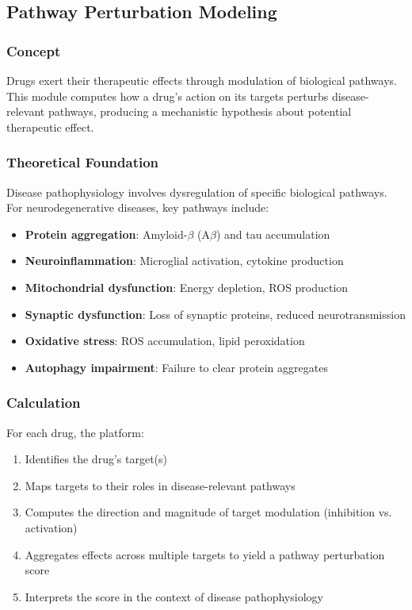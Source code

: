 \documentclass[12pt,a4paper]{article}
\begin{document}
\subsection{Pathway Perturbation Modeling}
\label{subsec:pathway}

\subsubsection{Concept}
Drugs exert their therapeutic effects through modulation of biological pathways. This module computes how a drug's action on its targets perturbs disease-relevant pathways, producing a mechanistic hypothesis about potential therapeutic effect.

\subsubsection{Theoretical Foundation}
Disease pathophysiology involves dysregulation of specific biological pathways. For neurodegenerative diseases, key pathways include:
\begin{itemize}
  \item \textbf{Protein aggregation}: Amyloid-$\beta$ (A$\beta$) and tau accumulation
  \item \textbf{Neuroinflammation}: Microglial activation, cytokine production
  \item \textbf{Mitochondrial dysfunction}: Energy depletion, ROS production
  \item \textbf{Synaptic dysfunction}: Loss of synaptic proteins, reduced neurotransmission
  \item \textbf{Oxidative stress}: ROS accumulation, lipid peroxidation
  \item \textbf{Autophagy impairment}: Failure to clear protein aggregates
\end{itemize}

\subsubsection{Calculation}
For each drug, the platform:
\begin{enumerate}
  \item Identifies the drug's target(s)
  \item Maps targets to their roles in disease-relevant pathways
  \item Computes the direction and magnitude of target modulation (inhibition vs. activation)
  \item Aggregates effects across multiple targets to yield a pathway perturbation score
  \item Interprets the score in the context of disease pathophysiology
\end{enumerate}
\end{document}
